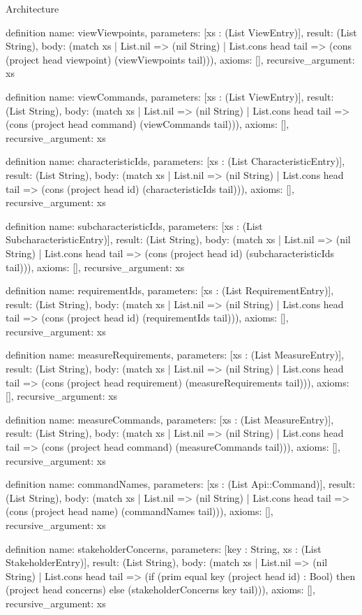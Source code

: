 \begin{lexlean}{Architecture}
\begin{semanticmodule}
definition{
  name: viewViewpoints,
  parameters: [xs : (List ViewEntry)],
  result: (List String),
  body: (match xs
    | List.nil => (nil String)
    | List.cons head tail => (cons (project head viewpoint) (viewViewpoints tail))),
  axioms: [],
  recursive_argument: xs
}

definition{
  name: viewCommands,
  parameters: [xs : (List ViewEntry)],
  result: (List String),
  body: (match xs
    | List.nil => (nil String)
    | List.cons head tail => (cons (project head command) (viewCommands tail))),
  axioms: [],
  recursive_argument: xs
}

definition{
  name: characteristicIds,
  parameters: [xs : (List CharacteristicEntry)],
  result: (List String),
  body: (match xs
    | List.nil => (nil String)
    | List.cons head tail => (cons (project head id) (characteristicIds tail))),
  axioms: [],
  recursive_argument: xs
}

definition{
  name: subcharacteristicIds,
  parameters: [xs : (List SubcharacteristicEntry)],
  result: (List String),
  body: (match xs
    | List.nil => (nil String)
    | List.cons head tail => (cons (project head id) (subcharacteristicIds tail))),
  axioms: [],
  recursive_argument: xs
}

definition{
  name: requirementIds,
  parameters: [xs : (List RequirementEntry)],
  result: (List String),
  body: (match xs
    | List.nil => (nil String)
    | List.cons head tail => (cons (project head id) (requirementIds tail))),
  axioms: [],
  recursive_argument: xs
}

definition{
  name: measureRequirements,
  parameters: [xs : (List MeasureEntry)],
  result: (List String),
  body: (match xs
    | List.nil => (nil String)
    | List.cons head tail => (cons (project head requirement) (measureRequirements tail))),
  axioms: [],
  recursive_argument: xs
}

definition{
  name: measureCommands,
  parameters: [xs : (List MeasureEntry)],
  result: (List String),
  body: (match xs
    | List.nil => (nil String)
    | List.cons head tail => (cons (project head command) (measureCommands tail))),
  axioms: [],
  recursive_argument: xs
}

definition{
  name: commandNames,
  parameters: [xs : (List Api::Command)],
  result: (List String),
  body: (match xs
    | List.nil => (nil String)
    | List.cons head tail => (cons (project head name) (commandNames tail))),
  axioms: [],
  recursive_argument: xs
}

definition{
  name: stakeholderConcerns,
  parameters: [key : String, xs : (List StakeholderEntry)],
  result: (List String),
  body: (match xs
    | List.nil => (nil String)
    | List.cons head tail => (if (prim equal key (project head id) : Bool) then (project head concerns) else (stakeholderConcerns key tail))),
  axioms: [],
  recursive_argument: xs
}


\end{semanticmodule}
\end{lexlean}
